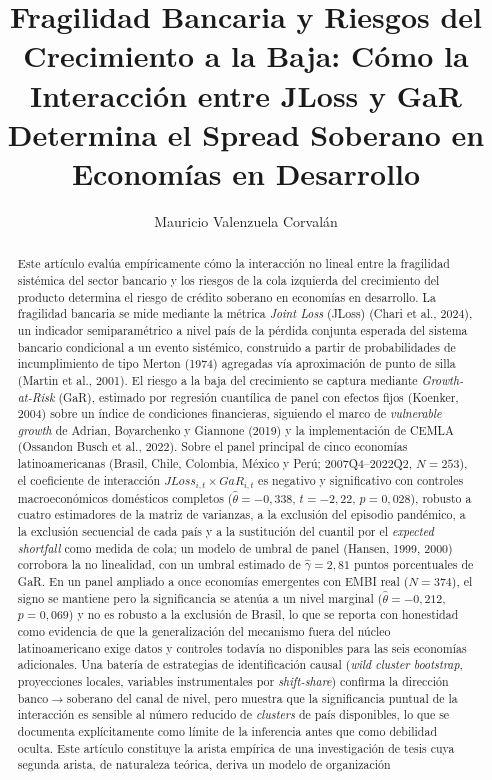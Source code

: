 \documentclass[5p,times,twocolumn,authoryear]{elsarticle}
\begin{document}
\begin{frontmatter}

\title{Fragilidad Bancaria y Riesgos del Crecimiento a la Baja: Cómo la Interacción entre JLoss y GaR Determina el Spread Soberano en Economías en Desarrollo}

\author[1]{Mauricio Valenzuela Corvalán}

\begin{abstract}
Este artículo evalúa empíricamente cómo la interacción no lineal entre la fragilidad sistémica del sector bancario y los riesgos de la cola izquierda del crecimiento del producto determina el riesgo de crédito soberano en economías en desarrollo. La fragilidad bancaria se mide mediante la métrica \textit{Joint Loss} (JLoss) (Chari et al., 2024), un indicador semiparamétrico a nivel país de la pérdida conjunta esperada del sistema bancario condicional a un evento sistémico, construido a partir de probabilidades de incumplimiento de tipo Merton (1974) agregadas vía aproximación de punto de silla (Martin et al., 2001). El riesgo a la baja del crecimiento se captura mediante \textit{Growth-at-Risk} (GaR), estimado por regresión cuantílica de panel con efectos fijos (Koenker, 2004) sobre un índice de condiciones financieras, siguiendo el marco de \textit{vulnerable growth} de Adrian, Boyarchenko y Giannone (2019) y la implementación de CEMLA (Ossandon Busch et al., 2022). Sobre el panel principal de cinco economías latinoamericanas (Brasil, Chile, Colombia, México y Perú; 2007Q4--2022Q2, $N=253$), el coeficiente de interacción $JLoss_{i,t}\times GaR_{i,t}$ es negativo y significativo con controles macroeconómicos domésticos completos ($\hat\theta=-0{,}338$, $t=-2{,}22$, $p=0{,}028$), robusto a cuatro estimadores de la matriz de varianzas, a la exclusión del episodio pandémico, a la exclusión secuencial de cada país y a la sustitución del cuantil por el \textit{expected shortfall} como medida de cola; un modelo de umbral de panel (Hansen, 1999, 2000) corrobora la no linealidad, con un umbral estimado de $\hat\gamma=2{,}81$ puntos porcentuales de GaR. En un panel ampliado a once economías emergentes con EMBI real ($N=374$), el signo se mantiene pero la significancia se atenúa a un nivel marginal ($\hat\theta=-0{,}212$, $p=0{,}069$) y no es robusto a la exclusión de Brasil, lo que se reporta con honestidad como evidencia de que la generalización del mecanismo fuera del núcleo latinoamericano exige datos y controles todavía no disponibles para las seis economías adicionales. Una batería de estrategias de identificación causal (\textit{wild cluster bootstrap}, proyecciones locales, variables instrumentales por \textit{shift-share}) confirma la dirección banco$\to$soberano del canal de nivel, pero muestra que la significancia puntual de la interacción es sensible al número reducido de \textit{clusters} de país disponibles, lo que se documenta explícitamente como límite de la inferencia antes que como debilidad oculta. Este artículo constituye la arista empírica de una investigación de tesis cuya segunda arista, de naturaleza teórica, deriva un modelo de organización 
\end{abstract}
\end{frontmatter}
\end{document}
